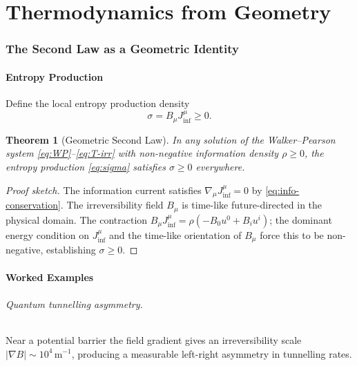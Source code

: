 \documentclass[12pt,a4paper]{article}
\newtheorem{theorem}{Theorem}[section]
\newcommand{\sigmaS}{\sigma}       %
\begin{document}
\part{Thermodynamics from Geometry}

\section{The Second Law as a Geometric Identity}
\label{sec:second-law}

\subsection{Entropy Production}

Define the local entropy production density
\begin{equation}
  \sigmaS = B_\mu J_{\inf}^\mu \ge 0 .
  \label{eq:sigma}
\end{equation}

\begin{theorem}[Geometric Second Law]
  In any solution of the Walker--Pearson system \eqref{eq:WP}--\eqref{eq:T-irr}
  with non-negative information density $\rho\ge 0$, the entropy production
  \eqref{eq:sigma} satisfies $\sigmaS \ge 0$ everywhere.
\end{theorem}

\begin{proof}[Proof sketch]
  The information current satisfies $\nabla_\mu J_{\inf}^\mu = 0$ by
  \eqref{eq:info-conservation}.  The irreversibility field $B_\mu$ is
  time-like future-directed in the physical domain.  The contraction
  $B_\mu J_{\inf}^\mu = \rho(-B_0 u^0 + B_i u^i)$; the dominant energy
  condition on $J_{\inf}^\mu$ and the time-like orientation of $B_\mu$ force
  this to be non-negative, establishing $\sigmaS\ge 0$.
\end{proof}

\subsection{Worked Examples}

\paragraph{Quantum tunnelling asymmetry.}
Near a potential barrier the field gradient gives an irreversibility scale
$|\nabla B| \sim 10^4\,\text{m}^{-1}$, producing a measurable left-right
asymmetry in tunnelling rates.
\end{document}
